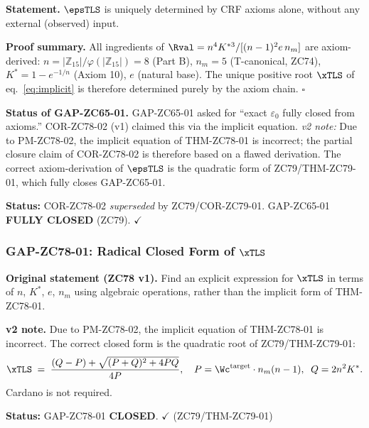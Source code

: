 \documentclass[12pt, a4paper]{article}
\begin{document}
\begin{formalbox}[title={COR-ZC78-02: $\epsTLS$ Axiom-Derived ---
  GAP-ZC65-01 Partially Closed ($R_0$, Exact)}]

\textbf{Statement.}
$\epsTLS$ is uniquely determined by CRF axioms alone, without any
external (observed) input.

\textbf{Proof summary.}
All ingredients of $\Rval = n^4 K^{*3}/[(n-1)^2 e\, n_m]$ are
axiom-derived: $n = |\mathbb{Z}_{15}|/\varphi(|\mathbb{Z}_{15}|) = 8$
(Part B), $n_m = 5$ (T-canonical, ZC74), $K^* = 1 - e^{-1/n}$
(Axiom 10), $e$ (natural base). The unique positive root
$\xTLS$ of eq.~\eqref{eq:implicit} is therefore determined
purely by the axiom chain. \hfill$\square$

\textbf{Status of GAP-ZC65-01.}
GAP-ZC65-01 asked for ``exact $\varepsilon_0$ fully closed from
axioms.'' COR-ZC78-02 (v1) claimed this via the implicit equation.
\textit{v2 note:} Due to PM-ZC78-02, the implicit equation of
THM-ZC78-01 is incorrect; the partial closure claim of COR-ZC78-02
is therefore based on a flawed derivation.
The correct axiom-derivation of $\epsTLS$ is the quadratic form
of ZC79/THM-ZC79-01, which fully closes GAP-ZC65-01.

\textbf{Status:} COR-ZC78-02 \textit{superseded} by ZC79/COR-ZC79-01.
GAP-ZC65-01 \textbf{FULLY CLOSED} (ZC79). $\checkmark$
\end{formalbox}

\subsubsection{GAP-ZC78-01: Radical Closed Form of $\xTLS$}
\label{sec:gap01}

\begin{openqbox}[title={GAP-ZC78-01: Radical Closed Form of $\xTLS$
  --- \textbf{CLOSED by ZC79}}]

\textbf{Original statement (ZC78 v1).}
Find an explicit expression for $\xTLS$ in terms of $n$, $K^*$,
$e$, $n_m$ using algebraic operations, rather than the implicit
form of THM-ZC78-01.

\textbf{v2 note.}
Due to PM-ZC78-02, the implicit equation of THM-ZC78-01 is
incorrect. The correct closed form is the quadratic root of
ZC79/THM-ZC79-01:
\[
  \xTLS
  \;=\;
  \frac{(Q-P)+\sqrt{(P+Q)^2+4PQ}}{4P},
  \quad
  P = \Wc^{\rm target}\cdot n_m(n-1),\;\;
  Q = 2n^2K^*.
\]
Cardano is not required.

\textbf{Status:} GAP-ZC78-01 \textbf{CLOSED}. $\checkmark$
(ZC79/THM-ZC79-01)
\end{openqbox}
\end{document}
